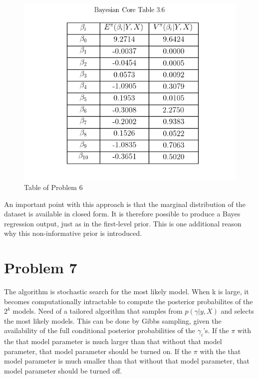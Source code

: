 \documentclass{article}
\begin{document}
\begin{figure}[h!]
\centering
\includegraphics[scale=0.6]{Table3_6.png}
\caption{Table of Problem 6}
\end{figure}

An important point with this approach is that the marginal distribution of the dataset is available in closed form. It is therefore possible to produce a Bayes regression output, just as in the first-level prior. This is one additional reason why this non-informative prior is introduced.

\newpage
\section{Problem 7}

The algorithm is stochastic search for the most likely model.
When k is large, it becomes computationally intractable to compute the posterior probabilites of the $2^{k}$ models. Need of a tailored algorithm that samples from $p(\gamma|y, X)$ and selects the most likely models.
This can be done by Gibbs sampling, given the availability of the full conditional posterior probabilities of the $\gamma_{i}$'s.
If the $\pi$ with the that model parameter is much larger than that without that model parameter, that model parameter should be turned on. 
If the $\pi$ with the that model parameter is much smaller than that without that model parameter, that model parameter should be turned off. 
\end{document}
